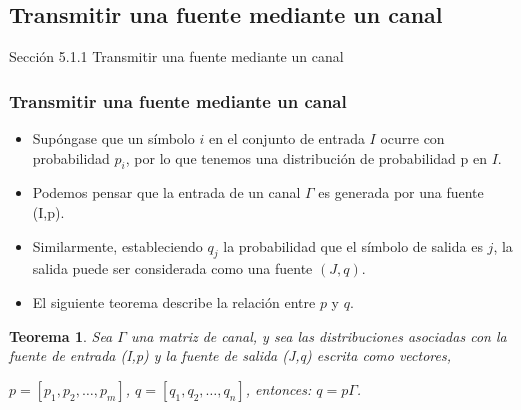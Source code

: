 \documentclass{beamer}
\theoremstyle{plain}
\newtheorem{teorema} [Teorema] {Teorema}
\theoremstyle{example}
\theoremstyle{example}
\begin{document}
\subsection{Transmitir una fuente mediante un canal}

\begin{frame}   \footnotesize
{
\begin{block}{Sección 5.1.1}
Transmitir una fuente mediante un canal
\end{block}
}
\end{frame} 


\begin{frame} \frametitle{Transmitir una fuente mediante un canal} \small  
\begin{itemize}  

\item Supóngase que un símbolo $i$ en el conjunto de entrada $I$ ocurre con probabilidad $p_i$, por lo que tenemos una distribución de probabilidad p en $I$.

\item Podemos pensar que la entrada de un canal $\Gamma$ es generada por una fuente (I,p). 

\item Similarmente, estableciendo $q_j$ la probabilidad que el símbolo de salida es $j$, la salida puede ser considerada como una fuente $(J,q)$.
 
\item  El siguiente teorema describe la relación entre $p$ y $q$. 


\end{itemize} 

\begin{teorema}
Sea $\Gamma$ una matriz de canal, y sea las distribuciones asociadas con la fuente de entrada (I,p) y la fuente de salida (J,q) escrita como vectores,

\begin{center}
$p = [p_1,p_2,\ldots,p_m]$,	$q = [q_1,q_2,\ldots,q_n]$, entonces: $q = p\Gamma$.
\end{center}

\end{teorema}


\end{frame} 
\end{document}
